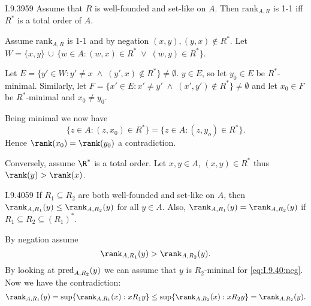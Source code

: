 \begin{lexcopy}{I.9.39}{59}
Assume that $R$ is well-founded and set-like on $A$. Then
\(\textrm{rank}_{A,R}\) is 1-1 iff \(R^*\) is a total order of $A$.
\end{lexcopy}

Assume \(\textrm{rank}_{A,R}\) is 1-1
and by negation \((x,y),(y,x) \notin R^*\).
Let \(W = \{x,y\}\,\cup\,\{w\in A: (w,x)\in R^*\;\lor\; (w,y)\in R^*\}\).


Let \(E=\{y'\in W: y'\neq x\;\land\; (y',x)\notin R^*\}\neq \emptyset\).
\(y\in E\), so let \(y_0\in E\) be \(R^*\)-minimal.
Similarly, 
let \(F=\{x'\in E: x'\neq y' \;\land\; (x',y')\notin R^*\}\neq \emptyset\)
and let \(x_0\in F\) be \(R^*\)-minimal and \(x_0 \neq y_0\).

Being minimal we now have
\begin{equation*}
\{z\in A: (z,x_0)\in R^*\} = \{z\in A: (z,y_o)\in R^*\}.
\end{equation*}
Hence \(\rank(x_0) = \rank(y_0)\) a contradiction.

Conversely, assume \(\R^*\) is a total order.
Let \(x,y\in A\), \wlogy \((x,y)\in R^*\) thus \(\rank(y)>\rank(x)\).


\begin{lexcopy}{I.9.40}{59}
If \(R_1 \subseteq R_2\) are both well-founded and set-like on $A$, then
\(\rank_{A,R_1}(y) \leq \rank_{A,R_2}(y)\)
for all \(y \in A\). Also, 
\(\rank_{A,R_1}(y) = \rank_{A,R_2}(y)\)
if \(R_1 \subseteq R_2 \subseteq (R_1)^*\).
\end{lexcopy}

By negation assume
\begin{equation} \label{eq:I.9.40:neg}
\rank_{A,R_1}(y) > \rank_{A,R_2}(y).
\end{equation}
By looking at \(\mathop{\mathrm{pred}}_{A,R_2}(y)\) we can assume that $y$ is \(R_2\)-mininal
for \eqref{eq:I.9.40:neg}.
Now we have the contradiction:
\begin{equation*}
\rank_{A,R_1}(y)
= \sup\{\rank_{A,R_1}(x): xR_1y\}
\leq 
  \sup\{\rank_{A,R_2}(x): xR_2y\} = \rank_{A,R_2}(y).
\end{equation*}

